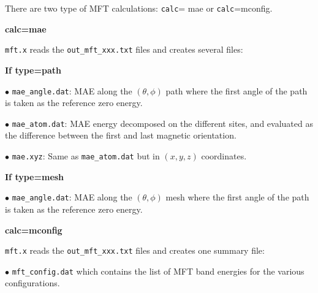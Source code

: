 \documentclass[12pt, onecolumn]{memoir}
\begin{document}
\noindent
There are two type of MFT calculations: \verb+calc+= mae or \verb+calc+=mconfig.

\begin{center}
{\color{blue}\textbf{calc=mae}  }
\end{center}

\noindent
\verb+mft.x+ reads the \verb+out_mft_xxx.txt+ files and creates several files:

\textbf{If type=path}

$\bullet$
\verb+mae_angle.dat+: MAE along the $(\theta, \phi)$ path where the first angle of the path is taken as the reference zero energy.

$\bullet$
\verb+mae_atom.dat+: MAE energy decomposed on the different sites, and evaluated as the difference between the first and last magnetic orientation. 

$\bullet$
\verb+mae.xyz+: Same as \verb+mae_atom.dat+ but in $(x,y,z)$ coordinates.

\textbf{If type=mesh}

$\bullet$
\verb+mae_angle.dat+: MAE along the $(\theta, \phi)$ mesh where the first angle of the path is taken as the reference zero energy.

\begin{center}
{\color{blue}\textbf{calc=mconfig}}
\end{center}

\noindent
\verb+mft.x+ reads the \verb+out_mft_xxx.txt+ files and creates one summary file:

$\bullet$ \verb+mft_config.dat+ which contains the list of MFT band energies for the various configurations.
\vfil
\pagebreak


\appendix
\backmatter
\end{document}
